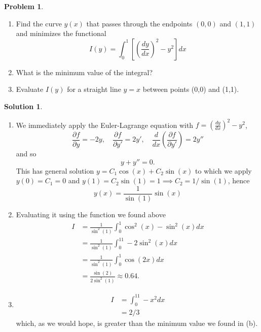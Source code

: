 \documentclass[10pt]{article}
\theoremstyle{definition}
\newtheorem{problem}{Problem}
\newtheorem{soln}{Solution}
\begin{document}
\begin{problem}~
\begin{enumerate}[label=(\alph*)]
  \item Find the curve $y(x)$ that passes through the endpoints $(0,0)$ and $(1,1)$ and minimizes the
        functional
        $$I(y)=\int_0^1\left[\left(\frac{dy}{dx}\right)^2-y^2\right]dx$$
  \item What is the minimum value of the integral?
  \item Evaluate $I(y)$ for a straight line $y=x$ between points (0,0) and (1,1).
\end{enumerate}
\end{problem}
\begin{soln}~
  \begin{enumerate}[label=(\alph*)]
    \item We immediately apply the Euler-Lagrange equation with $f=\left(\frac{dy}{dx}\right)^2-y^2$,
          $$\frac{\partial f}{\partial y}=-2y,\quad \frac{\partial f}{\partial y'}=2y',\quad
            \frac{d}{dx}\left(\frac{\partial f}{\partial y'}\right)=2y''$$
          and so
          $$y+y''=0.$$
          This has general solution $y=C_1\cos(x)+C_2\sin(x)$ to which we apply $y(0)=C_1=0$ and
          $y(1)=C_2\sin(1)=1\implies C_2=1/\sin(1)$, hence
          $$y(x)=\frac{1}{\sin(1)}\sin(x)$$
    \item Evaluating it using the function we found above
          \begin{align*}
            I & =\frac{1}{\sin^2(1)}\int_0^1\cos^2(x)-\sin^2(x)dx \\
              & =\frac{1}{\sin^2(1)}\int_0^11-2\sin^2(x)dx        \\
              & =\frac{1}{\sin^2(1)}\int_0^1\cos(2x)dx            \\
              & =\frac{\sin(2)}{2\sin^2(1)}\approx 0.64.
          \end{align*}
    \item \begin{align*}
            I & =\int_0^11-x^2dx \\
              & =2/3
          \end{align*}
          which, as we would hope, is greater than the minimum value we found in (b).
  \end{enumerate}
\end{soln}
\end{document}
